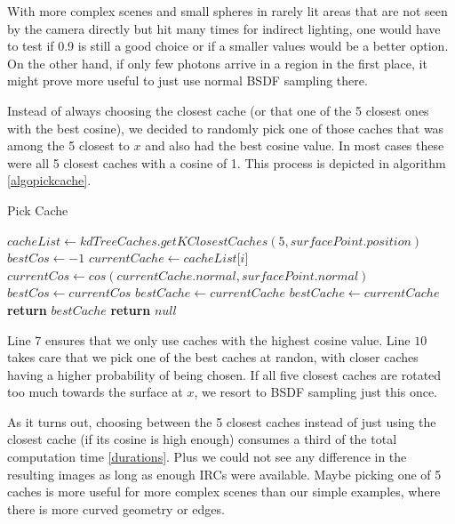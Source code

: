 With more complex scenes and small spheres in rarely lit areas that are not seen by the camera directly but hit many times for indirect lighting, one would have to test if 0.9 is still a good choice or if a smaller values would be a better option. On the other hand, if only few photons arrive in a region in the first place, it might prove more useful to just use normal BSDF sampling there.

Instead of always choosing the closest cache (or that one of the 5 closest ones with the best cosine), we decided to randomly pick one of those caches that was among the 5 closest to $x$ and also had the best cosine value. In most cases these were all 5 closest caches with a cosine of 1. This process is depicted in algorithm \ref{algopickcache}.\newline

\begin{algorithm}
\caption{Pick Cache}\label{pickCache}
\begin{algorithmic}[1]
\State $cacheList \gets kdTreeCaches.getKClosestCaches(5,surfacePoint.position)$
\State $bestCos \gets -1$
\State $currentCache \gets cacheList\lbrack i\rbrack$
\State $currentCos \gets cos(currentCache.normal, surfacePoint.normal)$
\State $bestCos\gets currentCos$
\State $bestCache \gets currentCache$
\State $bestCache\gets currentCache$
\Else
\EndIf
\EndFor
{}
\State \textbf{return} $bestCache$
\EndIf
\State \textbf{return} $null$ 
\EndProcedure
\end{algorithmic}
\label{algopickcache}
\end{algorithm}


Line $7$ ensures that we only use caches with the highest cosine value. Line $10$ takes care that we pick one of the best caches at randon, with closer caches having a higher probability of being chosen. If all five closest caches are rotated too much towards the surface at $x$, we resort to BSDF sampling just this once.

As it turns out, choosing between the 5 closest caches instead of just using the closest cache (if its cosine is high enough) consumes a third of the total computation time \ref{durations}. Plus we could not see any difference in the resulting images as long as enough IRCs were available. Maybe picking one of 5 caches is more useful for more complex scenes than our simple examples, where there is more curved geometry or edges.

